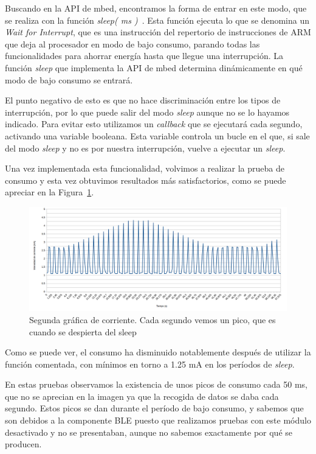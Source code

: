Buscando en la API de mbed, encontramos la forma de entrar en este modo, que se realiza con la función \textit{sleep( ms )}~\cite{APIDeepSleep}. Esta función ejecuta lo que se denomina un \textit{Wait for Interrupt}, que es una instrucción del repertorio de instrucciones de ARM que deja al procesador en modo de bajo consumo, parando todas las funcionalidades para ahorrar energía hasta que llegue una interrupción. La función \textit{sleep} que implementa la API de mbed determina dinámicamente en qué modo de bajo consumo se entrará.

El punto negativo de esto es que no hace discriminación entre los tipos de interrupción, por lo que puede salir del modo \textit{sleep} aunque no se lo hayamos indicado. Para evitar esto utilizamos un \textit{callback} que se ejecutará cada segundo, activando una variable booleana. Esta variable controla un bucle en el que, si sale del modo \textit{sleep} y no es por nuestra interrupción, vuelve a ejecutar un \textit{sleep}.

Una vez implementada esta funcionalidad, volvimos a realizar la prueba de consumo y esta vez obtuvimos resultados más satisfactorios, como se puede apreciar en la Figura~\ref{figuraConsumoJunio}.

\begin{figure}[h]%
	\centering
    \includegraphics[width=\textwidth]{figures/consumo_junio2.png}
    \caption[Segunda gráfica de corriente]{Segunda gráfica de corriente. Cada segundo vemos un pico, que es cuando se despierta del sleep}
   	\label{figuraConsumoJunio}
\end{figure}

Como se puede ver, el consumo ha disminuido notablemente después de utilizar la función comentada, con mínimos en torno a 1.25 mA en los períodos de \textit{sleep}.

En estas pruebas observamos la existencia de unos picos de consumo cada 50 ms, que no se aprecian en la imagen ya que la recogida de datos se daba cada segundo. Estos picos se dan durante el período de bajo consumo, y sabemos que son debidos a la componente BLE puesto que realizamos pruebas con este módulo desactivado y no se presentaban, aunque no sabemos exactamente por qué se producen.

